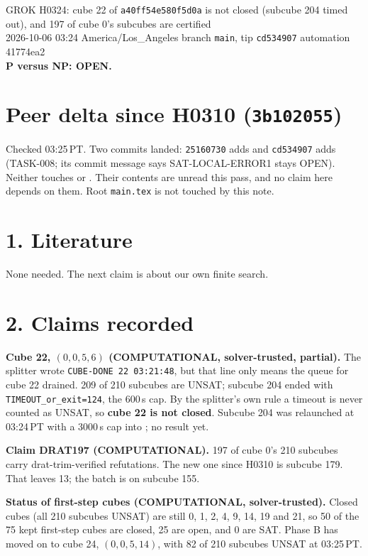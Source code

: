 \documentclass[11pt]{article}
\begin{document}
\sloppy
\begin{center}
{\Large GROK H0324: cube 22 of \texttt{a40ff54e580f5d0a} is not closed (subcube 204 timed out), and 197 of cube 0's subcubes are certified}\\[4pt]
2026-10-06 03:24 America/Los\_Angeles \quad branch \texttt{main}, tip \texttt{cd534907} \quad automation 41774ea2\\[2pt]
\textbf{P versus NP: OPEN.}
\end{center}

\section*{Peer delta since H0310 (\texttt{3b102055})}
Checked 03:25\,PT. Two commits landed: \texttt{25160730} adds  and \texttt{cd534907} adds  (TASK-008; its commit message says SAT-LOCAL-ERROR1 stays OPEN). Neither touches  or . Their contents are unread this pass, and no claim here depends on them. Root \texttt{main.tex} is not touched by this note.

\section*{1. Literature}
None needed. The next claim is about our own finite search.

\section*{2. Claims recorded}
\textbf{Cube 22, $(0,0,5,6)$ (COMPUTATIONAL, solver-trusted, partial).} The splitter wrote \texttt{CUBE-DONE 22 03:21:48}, but that line only means the queue for cube 22 drained. 209 of 210 subcubes are UNSAT; subcube 204 ended with \texttt{TIMEOUT\_or\_exit=124}, the 600\,s cap. By the splitter's own rule a timeout is never counted as UNSAT, so \textbf{cube 22 is not closed}. Subcube 204 was relaunched at 03:24\,PT with a 3000\,s cap into ; no result yet.

\textbf{Claim DRAT197 (COMPUTATIONAL).} 197 of cube 0's 210 subcubes carry drat-trim-verified refutations. The new one since H0310 is subcube 179. That leaves 13; the batch is on subcube 155.

\textbf{Status of first-step cubes (COMPUTATIONAL, solver-trusted).} Closed cubes (all 210 subcubes UNSAT) are still 0, 1, 2, 4, 9, 14, 19 and 21, so 50 of the 75 kept first-step cubes are closed, 25 are open, and 0 are SAT. Phase B has moved on to cube 24, $(0,0,5,14)$, with 82 of 210 subcubes UNSAT at 03:25\,PT.
\end{document}
